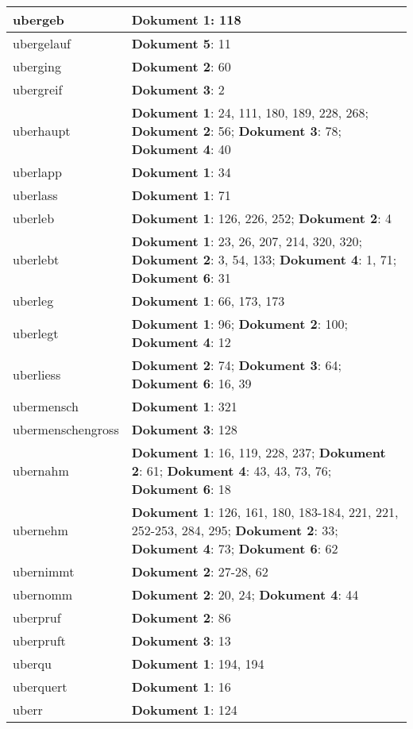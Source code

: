 \documentclass[a5paper]{article}
\begin{document}
\begin{longtable}[l]{|l|p{3in}|}
\hline
ubergeb & \textbf{Dokument 1}: 118 \\
\hline
ubergelauf & \textbf{Dokument 5}: 11 \\
\hline
uberging & \textbf{Dokument 2}: 60 \\
\hline
ubergreif & \textbf{Dokument 3}: 2 \\
\hline
uberhaupt & \textbf{Dokument 1}: 24, 111, 180, 189, 228, 268; \textbf{Dokument 2}: 56; \textbf{Dokument 3}: 78; \textbf{Dokument 4}: 40 \\
\hline
uberlapp & \textbf{Dokument 1}: 34 \\
\hline
uberlass & \textbf{Dokument 1}: 71 \\
\hline
uberleb & \textbf{Dokument 1}: 126, 226, 252; \textbf{Dokument 2}: 4 \\
\hline
uberlebt & \textbf{Dokument 1}: 23, 26, 207, 214, 320, 320; \textbf{Dokument 2}: 3, 54, 133; \textbf{Dokument 4}: 1, 71; \textbf{Dokument 6}: 31 \\
\hline
uberleg & \textbf{Dokument 1}: 66, 173, 173 \\
\hline
uberlegt & \textbf{Dokument 1}: 96; \textbf{Dokument 2}: 100; \textbf{Dokument 4}: 12 \\
\hline
uberliess & \textbf{Dokument 2}: 74; \textbf{Dokument 3}: 64; \textbf{Dokument 6}: 16, 39 \\
\hline
ubermensch & \textbf{Dokument 1}: 321 \\
\hline
ubermenschengross & \textbf{Dokument 3}: 128 \\
\hline
ubernahm & \textbf{Dokument 1}: 16, 119, 228, 237; \textbf{Dokument 2}: 61; \textbf{Dokument 4}: 43, 43, 73, 76; \textbf{Dokument 6}: 18 \\
\hline
ubernehm & \textbf{Dokument 1}: 126, 161, 180, 183-184, 221, 221, 252-253, 284, 295; \textbf{Dokument 2}: 33; \textbf{Dokument 4}: 73; \textbf{Dokument 6}: 62 \\
\hline
ubernimmt & \textbf{Dokument 2}: 27-28, 62 \\
\hline
ubernomm & \textbf{Dokument 2}: 20, 24; \textbf{Dokument 4}: 44 \\
\hline
uberpruf & \textbf{Dokument 2}: 86 \\
\hline
uberpruft & \textbf{Dokument 3}: 13 \\
\hline
uberqu & \textbf{Dokument 1}: 194, 194 \\
\hline
uberquert & \textbf{Dokument 1}: 16 \\
\hline
uberr & \textbf{Dokument 1}: 124 \\
\hline

\end{longtable}
\end{document}
